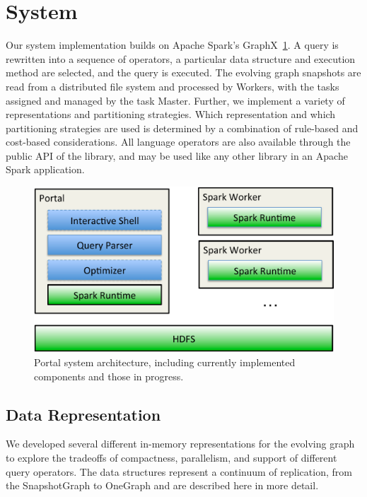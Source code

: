 \section{System}
\label{sec:sys}

Our \ql system implementation builds on Apache Spark's
GraphX~\ref{fig:arch}.  A \ql query is rewritten into a sequence of
operators, a particular data structure and execution method are
selected, and the query is executed.  The evolving graph snapshots are
read from a distributed file system and processed by Workers, with the
tasks assigned and managed by the task Master.  
Further, we implement a variety of \tg representations and
partitioning strategies.  Which representation and which partitioning
strategies are used is determined by a combination of rule-based and
cost-based considerations.  All language operators are also available
through the public API of the \ql library, and may be used like any
other library in an Apache Spark application.

\begin{figure}[t!]
\includegraphics{figs/architecture.pdf}
\caption{Portal system architecture, including currently implemented
  components and those in progress.}
\label{fig:arch}
\end{figure}

\subsection{Data Representation}

We developed several different in-memory representations for the
evolving graph to explore the tradeoffs of compactness, parallelism,
and support of different query operators.  The data structures
represent a continuum of replication, from the SnapshotGraph to
OneGraph and are described here in more detail.

